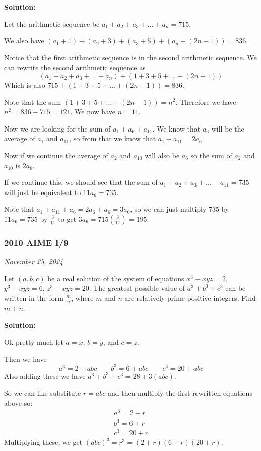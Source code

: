 \documentclass[../mathproblems.tex]{subfiles}
\begin{document}
\textbf{Solution:}

Let the arithmetic sequence be $a_1 + a_2 + a_3 + \dots + a_n = 715$.

We also have $(a_1+1) + (a_2 + 3) + (a_3 + 5) + (a_n+(2n-1)) = 836$.

Notice that the first arithmetic sequence is in the second arithmetic sequence. We can rewrite the second arithmetic sequence as 
\[ (a_1 + a_2 + a_3 + \dots + a_n) + (1 + 3 + 5 + \dots + (2n-1))\]
Which is also $715 + (1+3+5+\dots+(2n-1))=836$.

Note that the sum $(1+3+5+\dots+(2n-1))=n^2$. Therefore we have $n^2 = 836-715 = 121$. We now have $n=11$.

Now we are looking for the sum of $a_1+a_6+a_{11}$. We know that $a_6$ will be the average of $a_1$ and $a_{11}$, so from that we know that $a_1+a_{11} = 2a_6$.

Now if we continue the average of $a_2$ and $a_{10}$ will also be $a_6$ so the sum of $a_2$ and $a_{10}$ is $2a_6$.

If we continue this, we should see that the sum of $a_1 + a_2 + a_3 + \dots + a_{11} = 735$ will just be equivalent to $11a_6 = 735$. 

Note that $a_1+a_{11}+a_6 = 2a_6 + a_6 = 3a_6$, so we can just multiply $735$ by $11a_6=735$ by $\frac{3}{11}$ to get $3a_6=715\left(\frac{3}{11}\right) = \boxed{195}$.

\noindent\hrulefill

\subsubsection*{2010 AIME I/9} 
\textit{November 25, 2024}

Let $(a,b,c)$ be a real solution of the system of equations $x^3 - xyz = 2$, $y^3 - xyz = 6$, $z^3 - xyz = 20$. The greatest possible value of $a^3 + b^3 + c^3$ can be written in the form $\frac {m}{n}$, where $m$ and $n$ are relatively prime positive integers. Find $m + n$.

\textbf{Solution:}

Ok pretty much let $a=x$, $b=y$, and $c=z$.

Then we have
\[ a^3=2+abc \qquad b^3=6+abc \qquad c^3=20+abc \]
Also adding these we have $a^3+b^3+c^3=28+3(abc)$.

So we can like substitute $r=abc$ and then multiply the first rewritten equations above so:
\begin{align*} a^3 = 2+r\\ b^3 = 6+r\\ c^3 = 20+r \end{align*}Multiplying these, we get
$(abc)^3=r^3=(2+r)(6+r)(20+r)$.
\end{document}
